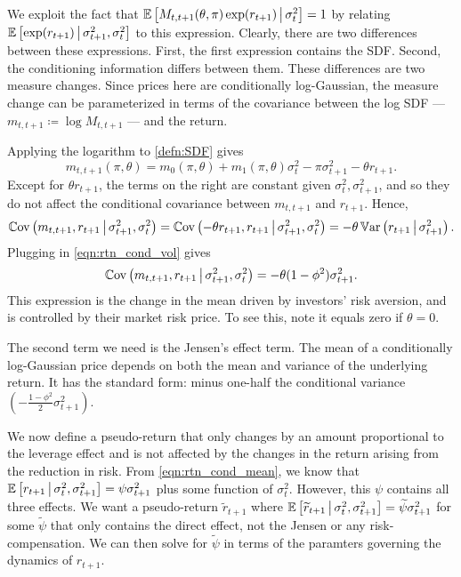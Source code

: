 \documentclass[11pt, letterpaper, twoside]{article}
\begin{document}
We exploit the fact that $\operatorname{\mathbb{E}}\left[M_{t,t+1}(\theta, \pi) \exp(r_{t+1}) \,\middle\vert\, \sigma^2_t \right] = 1$ by relating $\operatorname{\mathbb{E}}\left[\exp(r_{t+1}) \,\middle\vert\, \sigma^2_{t+1}, \sigma^2_t \right]$ to this expression. Clearly, there are two differences between these expressions. First, the first expression contains the SDF. Second, the conditioning information differs between them. These differences are two measure changes. Since prices here are conditionally log-Gaussian, the measure change can be parameterized in terms of the covariance between the log SDF --- $m_{t,t+1} \coloneqq \log M_{t,t+1}$ --- and the return.

Applying the logarithm to \cref{defn:SDF} gives
%
\begin{equation}
    \label{eqn:log_sdf}
    m_{t,t+1}(\pi, \theta) = m_{0}(\pi, \theta) + m_1(\pi, \theta) \sigma_t^2 - \pi \sigma^2_{t+1} - \theta r_{t+1}.
\end{equation}
%
Except for $\theta r_{t+1}$, the terms on the right are constant given $\sigma^2_t, \sigma^2_{t+1}$, and so they do not affect the conditional covariance between $m_{t,t+1}$ and $r_{t+1}$. Hence,
%
\begin{equation}
 \Cov\left(m_{t,t+1}, r_{t+1} \mvert \sigma^2_{t+1}, \sigma^2_t \right) 
%
 = \Cov\left(-\theta r_{t+1}, r_{t+1} \mvert \sigma^2_{t+1}, \sigma^2_t \right) 
%
 = -\theta \Var\left(r_{t+1} \mvert \sigma^2_{t+1}\right). 
\end{equation}
%
Plugging in \cref{eqn:rtn_cond_vol} gives
%
\begin{equation}
    \label{eqn:return_covarinace}
    \operatorname{\mathbb{C}ov}\left(m_{t,t+1}, r_{t+1} \,\middle\vert\, \sigma^2_{t+1}, \sigma^2_t \right) = -\theta (1 - \phi^2) \sigma^2_{t+1}.
\end{equation}
%
This expression is the change in the mean driven by investors' risk aversion, and is controlled by their market risk price. To see this, note it equals zero if $\theta = 0$.

The second term we need is the Jensen's effect term. The mean of a conditionally log-Gaussian price depends on both the mean and variance of the underlying return. It has the standard form: minus one-half the conditional variance $\left(-\frac{1 - \phi^2}{2} \sigma^2_{t+1}\right)$. 

We now define a pseudo-return that only changes by an amount proportional to the leverage effect and is not affected by the changes in the return arising from the reduction in risk. From \cref{eqn:rtn_cond_mean}, we know that $\operatorname{\mathbb{E}}\left[r_{t+1} \,\middle\vert\, \sigma^2_t, \sigma^2_{t+1} \right] = \psi \sigma^2_{t+1}$ plus some function of $\sigma^2_t$. However, this $\psi$ contains all three effects. We want a pseudo-return $\widetilde{r}_{t+1}$ where $\operatorname{\mathbb{E}}\left[\widetilde{r}_{t+1} \,\middle\vert\, \sigma^2_t, \sigma^2_{t+1} \right] = \widetilde{\psi} \sigma^2_{t+1}$ for some $\widetilde{\psi}$ that only contains the direct effect, not the Jensen or any risk-compensation. We can then solve for $\widetilde{\psi}$ in terms of the paramters governing the dynamics of $r_{t+1}$.
\end{document}
